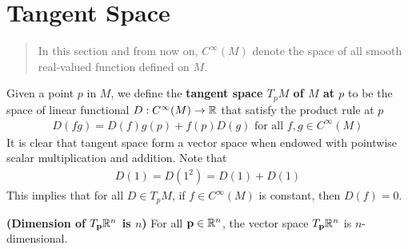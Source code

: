 \documentclass{report}
\begin{document}
\section{Tangent Space}
\begin{abstract}
In this section and from now on, $C^{\infty}(M)$ denote the space of all smooth real-valued function defined on $M$. 
\end{abstract}
\begin{mdframed}
Given a point $p$ in  $M$, we define the  \textbf{tangent space $T_pM$ of $M$ at $p$} to be the space of linear functional $D:C^{\infty}(M)\rightarrow \mathbb{R}$ that satisfy the product rule at $p$ 
 \begin{align*}
   D(fg)=D(f) g(p)+ f(p)D(g)\text{ for all }f,g\in C^{\infty}(M)
\end{align*}
It is clear that tangent space form a vector space when endowed with pointwise scalar multiplication and addition. Note that 
\begin{align*}
D(1)=D(1^2)=D(1)+D(1)
\end{align*}
This implies that for all $D \in T_pM$, if  $f\in C^{\infty}(M)$ is constant, then $D(f)=0$. 
\end{mdframed}
\begin{theorem}
\label{Dtprn}
\textbf{(Dimension of $T_\textbf{p}\mathbb{R}^n$ is $n$)} For all $\textbf{p}\in\mathbb{R}^n$, the vector space $T_\textbf{p}\mathbb{R}^n$ is $n$-dimensional. 
\end{theorem}
\end{document}
